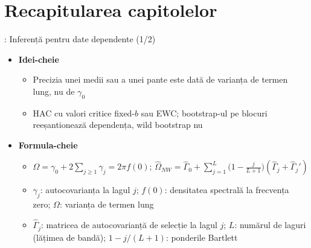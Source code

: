 \section{Recapitularea capitolelor}

\begin{frame}{: Inferență pentru date dependente (1/2)}
\itemsize{\footnotesize}
\begin{itemize}
    \item \textbf{Idei-cheie}
    \begin{itemize}
        \item Precizia unei medii sau a unei pante este dată de varianța de termen lung, nu de $\gamma_0$
        \item HAC cu valori critice fixed-$b$ sau EWC; bootstrap-ul pe blocuri reeșantionează dependența, wild bootstrap nu
    \end{itemize}
    \item \textbf{Formula-cheie}
    \begin{itemize}
        \item $\Omega = \gamma_0 + 2\sum_{j\ge1}\gamma_j = 2\pi f(0)$; $\hat\Omega_{NW} = \hat\Gamma_0 + \sum_{j=1}^{L}\big(1 - \frac{j}{L+1}\big)(\hat\Gamma_j + \hat\Gamma_j')$
        \item $\gamma_j$: autocovarianța la lagul $j$; $f(0)$: densitatea spectrală la frecvența zero; $\Omega$: varianța de termen lung
        \item $\hat\Gamma_j$: matricea de autocovarianță de selecție la lagul $j$; $L$: numărul de laguri (lățimea de bandă); $1 - j/(L + 1)$: ponderile Bartlett
    \end{itemize}
\end{itemize}
\end{frame}

